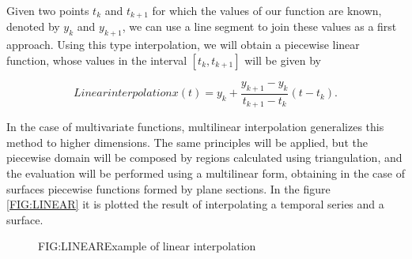 
Given two points $t_k$ and $t_{k+1}$ for which the values of our function are
known, denoted by $y_k$ and $y_{k+1}$, we can use a line segment to join these
values as a first approach. Using this type interpolation, we will obtain a
piecewise linear function, whose values in the interval $[t_k, t_{k+1}]$ will
be given by

\begin{equation}[]{Linear interpolation}
 x(t)= y_{k}+\frac{y_{k+1}-y_{k}}{t_{k+1}-t_{k}}\left(t-t_{k}\right).
\end{equation}

In the case of multivariate functions, multilinear interpolation
 generalizes this method to higher dimensions.
The same principles will be applied, but the piecewise domain will be composed
by regions calculated using triangulation, and the evaluation will be performed
using a multilinear form, obtaining in the case of surfaces piecewise
functions formed by plane sections. In the figure \ref{FIG:LINEAR} it is plotted
the result of interpolating a temporal series and a surface.


\begin{figure}[Example of linear interpolation]{FIG:LINEAR}{Example of linear interpolation}
   \quad
\end{figure}
